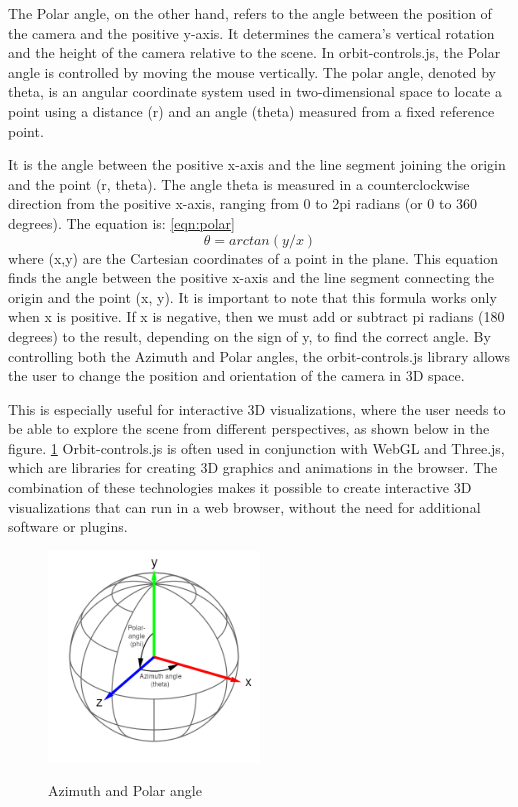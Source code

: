 The Polar angle, on the other hand, refers to the angle between the position of the camera and the 
positive y-axis. It determines the camera's vertical rotation and the height of the camera relative 
to the scene. In orbit-controls.js, the Polar angle is controlled by moving the mouse vertically.
The polar angle, denoted by theta, is an angular coordinate system used in two-dimensional space to locate 
a point using a distance (r) and an angle (theta) measured from a fixed reference point.

It is the angle between the positive x-axis and the line segment 
joining the origin and the point (r, theta). The angle theta is measured in a counterclockwise direction 
from the positive x-axis, ranging from 0 to 2pi radians (or 0 to 360 degrees). The equation is: \ref{eqn:polar}
\begin{equation}
  \label{eqn:polar}
  \theta = arctan(y/x)
\end{equation}
where (x,y) are the Cartesian coordinates of a point in the plane. This equation finds the angle between the positive x-axis 
and the line segment connecting the origin and the point (x, y).
It is important to note that this formula works only when x is positive. If x is negative, 
then we must add or subtract pi radians (180 degrees) to the result, depending on the sign of y, to find the correct angle.
By controlling both the Azimuth and Polar angles, the orbit-controls.js library allows the user to 
change the position and orientation of the camera in 3D space. 

This is especially useful for interactive 3D visualizations, where the user needs to be able to explore the scene from different perspectives, as shown below in the figure. \ref{fig:orbitcontrols}
Orbit-controls.js is often used in conjunction with WebGL and Three.js, which are libraries for creating 
3D graphics and animations in the browser. The combination of these technologies makes it possible to create 
interactive 3D visualizations that can run in a web browser, without the need for additional software or plugins.
\\
\begin{figure}[htb]
  \centering
  \includegraphics[width=0.5\textwidth]{pics/orbitcontrols.png}
  \caption{Azimuth and Polar angle}
  \cite{angles}
  \label{fig:orbitcontrols}
\end{figure}

